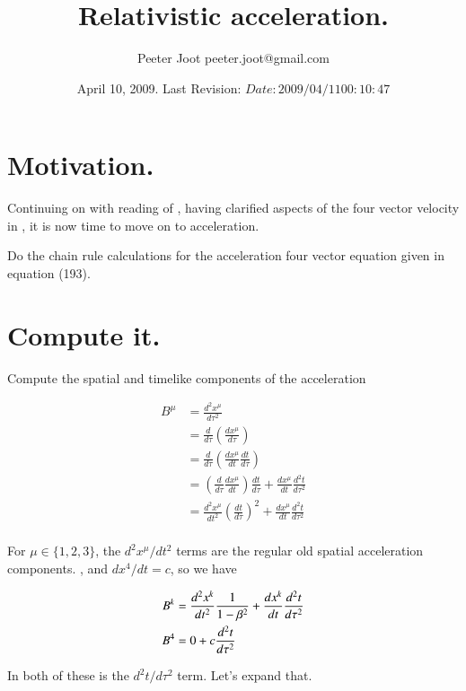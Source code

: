 \documentclass{article}
\title{ Relativistic acceleration. }
\author{Peeter Joot \quad peeter.joot@gmail.com }
\date{ April 10, 2009.  Last Revision: $Date: 2009/04/11 00:10:47 $ }
\begin{document}
\maketitle{}
\tableofcontents
\section{ Motivation. }

Continuing on with reading of \cite{pauli1981tr}, having 
clarified aspects of the four vector velocity in \cite{PJrelativityFourVectorVelocity}, it is now
time to move on to acceleration.

Do the chain rule calculations for the acceleration four vector equation given in equation (193).

\section{ Compute it. }

Compute the spatial and timelike components of the acceleration

\begin{align*}
B^\mu 
&= \frac{d^2 x^\mu}{d\tau^2} \\
&= \frac{d }{d\tau} \left( \frac{d x^\mu }{d\tau} \right) \\
&= \frac{d }{d\tau} \left( \frac{d x^\mu }{dt} \frac{dt}{d\tau} \right) \\
&= \left( \frac{d }{d\tau} \frac{d x^\mu }{dt} \right) \frac{dt}{d\tau} + \frac{d x^\mu }{dt} \frac{d^2t}{d\tau^2} \\
&= \frac{d^2 x^\mu }{dt^2} \left( \frac{dt}{d\tau} \right)^2 + \frac{d x^\mu }{dt} \frac{d^2t}{d\tau^2} \\
\end{align*}

For $\mu \in \{1,2,3\}$, the ${d^2 x^\mu }/{dt^2}$ terms are the regular old spatial acceleration components.
, and $dx^4/dt = c$, so we have

\begin{align*}
B^k &= \frac{d^2 x^k }{dt^2} \frac{1}{1-\beta^2} + \frac{d x^k }{dt} \frac{d^2t}{d\tau^2} \\
B^4 &= 0 + c \frac{d^2t}{d\tau^2} \\
\end{align*}

In both of these is the $d^2t/d\tau^2$ term.  Let's expand that.



\end{document}
